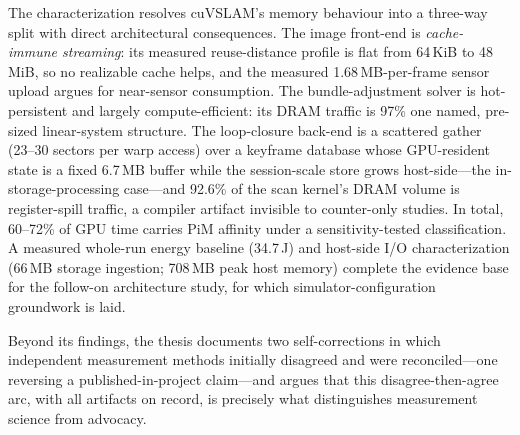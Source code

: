 The characterization resolves cuVSLAM's memory behaviour into a three-way
split with direct architectural consequences. The image front-end is
\emph{cache-immune streaming}: its measured reuse-distance profile is flat
from 64\,KiB to 48\,MiB, so no realizable cache helps, and the measured
1.68\,MB-per-frame sensor upload argues for near-sensor consumption. The
bundle-adjustment solver is hot-persistent and largely compute-efficient: its
DRAM traffic is 97\% one named, pre-sized linear-system structure. The
loop-closure back-end is a scattered gather (23--30 sectors per warp access)
over a keyframe database whose GPU-resident state is a fixed 6.7\,MB buffer
while the session-scale store grows host-side---the in-storage-processing
case---and 92.6\% of the scan kernel's DRAM volume is register-spill traffic,
a compiler artifact invisible to counter-only studies. In total, 60--72\% of
GPU time carries PiM affinity under a sensitivity-tested classification. A
measured whole-run energy baseline (34.7\,J) and host-side I/O
characterization (66\,MB storage ingestion; 708\,MB peak host memory) complete
the evidence base for the follow-on architecture study, for which
simulator-configuration groundwork is laid.

Beyond its findings, the thesis documents two self-corrections in which
independent measurement methods initially disagreed and were reconciled---one
reversing a published-in-project claim---and argues that this
disagree-then-agree arc, with all artifacts on record, is precisely what
distinguishes measurement science from advocacy.
